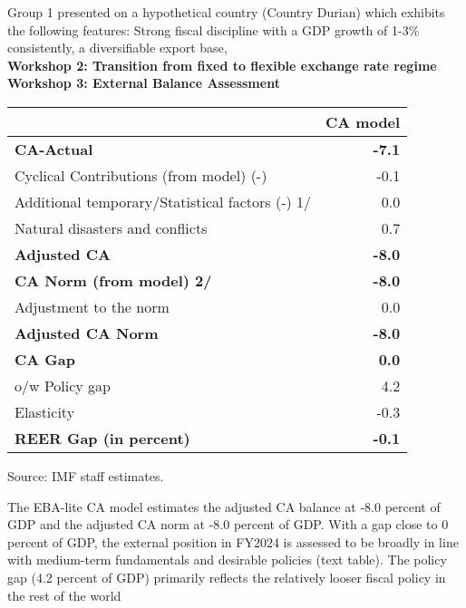 \documentclass[12pt]{article}
\begin{document}
     Group 1 presented on a hypothetical country (Country Durian) which exhibits the following features: Strong fiscal discipline with a GDP growth of 1-3\% consistently, a diversifiable export base, \\
\textbf{Workshop 2: Transition from fixed to flexible exchange rate regime} \\
\textbf{Workshop 3: External Balance Assessment} \\



\begin{table}[h!]
\centering
\renewcommand{\arraystretch}{1.3} %

\begin{tabular}{@{}l r@{}} %
\hline
 & \textbf{CA model} \\
\hline
\textbf{CA-Actual} & \textbf{-7.1} \\
\quad Cyclical Contributions (from model) (-) & -0.1 \\
\quad Additional temporary/Statistical factors (-) 1/ & 0.0 \\
\quad Natural disasters and conflicts & 0.7 \\
\textbf{Adjusted CA} & \textbf{-8.0} \\[6pt]

\textbf{CA Norm (from model) 2/} & \textbf{-8.0} \\
\quad Adjustment to the norm & 0.0 \\
\textbf{Adjusted CA Norm} & \textbf{-8.0} \\[6pt]

\textbf{CA Gap} & \textbf{0.0} \\
\quad o/w Policy gap & 4.2 \\[6pt]

Elasticity & -0.3 \\
\textbf{REER Gap (in percent)} & \textbf{-0.1} \\
\hline
\end{tabular}

\vspace{2pt}

\centering
\quad \quad \parbox{\linewidth}{\hspace{0pt}\footnotesize Source: IMF staff estimates.}

\end{table}
The EBA-lite CA model estimates the adjusted CA balance at -8.0 percent of GDP and the 
adjusted CA norm at -8.0 percent of GDP. With a gap close to 0 percent of GDP, the external position in 
FY2024 is assessed to be broadly in line with medium-term fundamentals and desirable policies (text table). 
The policy gap (4.2 percent of GDP) primarily reflects the relatively looser fiscal policy in the rest of the 
world
\end{document}
